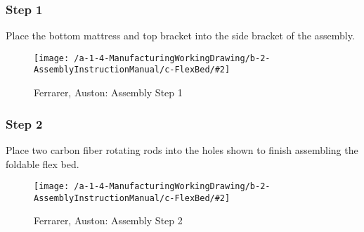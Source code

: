 \newcommand{\AssemblyManualFlexBed}[3]{
\subsubsection{Step #1}
\begin{center}
#3
\begin{figure}[!ht]
\texttt{[image: /a-1-4-ManufacturingWorkingDrawing/b-2-AssemblyInstructionManual/c-FlexBed/\#2]}
\caption{Ferrarer, Auston: Assembly Step #1}
\end{figure}
\end{center}
}

\AssemblyManualFlexBed{1}{step1.jpeg}{
Place the bottom mattress and top bracket into the side bracket of the assembly.
}
\AssemblyManualFlexBed{2}{step2.jpeg}{
Place two carbon fiber rotating rods into the holes shown to finish assembling the foldable flex bed.
}
